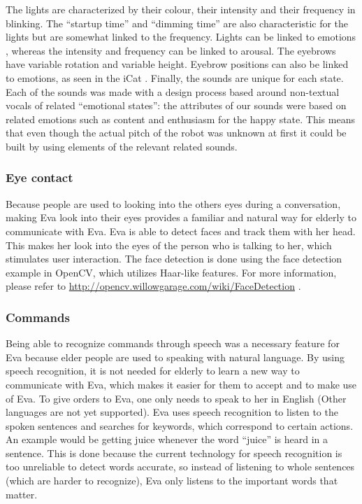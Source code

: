 \documentclass[project_eva.tex]{subfiles}
\begin{document}
The lights are characterized by their colour, their intensity and their frequency in blinking. The ``startup time'' and 
``dimming time'' are also characteristic for the lights but are somewhat linked to the frequency. Lights can be linked to 
emotions \cite{colour-emotion} , whereas the intensity and frequency can be linked to arousal. The eyebrows have variable 
rotation and variable height. Eyebrow positions can also be linked to emotions, as seen in the iCat \cite{iCat}. Finally, 
the sounds are unique for each state. Each of the sounds was made with a design process based around non-textual vocals 
of related ``emotional states'': the attributes of our sounds were based on related emotions  such as content and 
enthusiasm for the happy state. This means that even though the actual pitch of the robot was unknown at first it could 
be built by using elements \cite{sounds} of the relevant related sounds.

\subsubsection*{Eye contact}
Because people are used to looking into the other\textquotesingle s eyes during a conversation, making Eva look into 
their eyes provides a familiar and natural way for elderly to communicate with Eva. Eva is able to detect faces and 
track them with her head. This makes her look into the eyes of the person who is talking to her, which stimulates user 
interaction. The face detection is done using the face detection example in OpenCV, which utilizes Haar-like features. 
For more information, please refer to \url{http://opencv.willowgarage.com/wiki/FaceDetection} \cite{FaceDetection} .

\subsubsection*{Commands}
Being able to recognize commands through speech was a necessary feature for Eva because elder people are used to speaking 
with natural language. By using speech recognition, it is not needed for elderly to learn a new way to communicate with 
Eva, which makes it easier for them to accept and to make use of Eva. To give orders to Eva, one only needs to speak to 
her in English (Other languages are not yet supported). Eva uses speech recognition to listen to the spoken sentences and 
searches for keywords, which correspond to certain actions. An example would be getting juice whenever the word ``juice'' 
is heard in a sentence. This is done because the current technology for speech recognition is too unreliable to detect 
words accurate, so instead of listening to whole sentences (which are harder to recognize), Eva only listens to the 
important words that matter.
\end{document}
